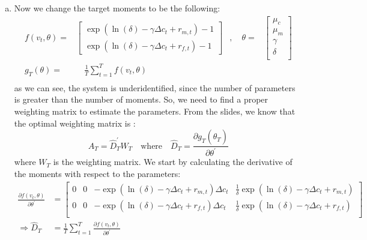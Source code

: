 \begin{enumerate}[(a)]
      \item Now we change the target moments to be the following:
      \begin{equation*}
        \begin{aligned}
          f(v_t,\theta) = & \begin{bmatrix}
            \exp(\ln(\delta) - \gamma\Delta c_t + r_{m,t})-1 \\
            \exp(\ln(\delta) - \gamma\Delta c_t + r_{f,t})-1
          \end{bmatrix} & , \quad 
          \theta = & \begin{bmatrix}
            \mu_c \\
            \mu_m \\
            \gamma \\
            \delta \\
          \end{bmatrix}  \\
          g_T(\theta) = & \quad \frac{1}{T} \sum_{t=1}^T f(v_t,\theta) & \\
        \end{aligned}
        \end{equation*}
        as we can see, the system is underidentified, since the number of parameters is greater than the number of moments. So, we need to find a proper weighting matrix to estimate the parameters. From the slides, we know that the optimal weighting matrix is :
        \begin{equation*}
          A_T = \hat{D}_T^{'}W_T \quad \text{where} \quad \hat{D}_T = \dfrac{\partial{g_T}(\hat{\theta}_T)}{\partial \theta^{'}}
        \end{equation*}
        where $W_T$ is the weighting matrix. We start by calculating the derivative of the moments with respect to the parameters:
        \begin{equation*}
          \begin{split}
            \frac{\partial f(v_t,\theta)}{\partial \theta^{'}} & = \begin{bmatrix}
              0 & 0 & -\exp(\ln(\delta) - \gamma\Delta c_t + r_{m,t})\Delta c_t & \frac{1}{\delta}\exp(\ln(\delta) - \gamma\Delta c_t + r_{m,t}) \\
              0 & 0 & -\exp(\ln(\delta) - \gamma\Delta c_t + r_{f,t})\Delta c_t & \frac{1}{\delta}\exp(\ln(\delta) - \gamma\Delta c_t + r_{f,t}) \\
            \end{bmatrix} \\
            \Rightarrow \hat{D}_T & = \frac{1}{T} \sum_{t=1}^T \frac{\partial f(v_t,\theta)}{\partial \theta^{'}}
          \end{split}
        \end{equation*}


\end{enumerate}
